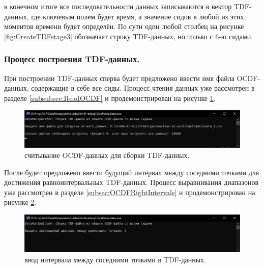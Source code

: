 {  \par в конечном итоге все последовательности данных записываются в вектор TDF-данных, где ключевым полем будет время, а значение сидов в любой из этих моментов времени будет определён. По сути один любой столбец на рисунке \ref{fig:CreateTDFstage3} обозначает строку TDF-данных, но только с 6-ю сидами. 

}

\subsubsection{ \standartTitleFont
  Процесс построения TDF-данных.
} \label{subsubsec:CreateTDFProc}

{\standartFont

  \par При построении TDF-данных сперва будет предложено ввести имя файла OCDF-данных, содержащие в себе все сиды. Процесс чтения данных уже рассмотрен в разделе \ref{subsubsec:ReadOCDF} и продемонстрирован на рисунке \ref{fig:CreateTDFReadData}. 

  \begin{figure}[H]
    \centering
    \includegraphics[width=\textwidth]{images/forDataManipulator/CreateTDFReadData.png}
    \caption{считывание OCDF-данных для сборки TDF-данных.} 
    \label{fig:CreateTDFReadData}
  \end{figure}

  \par После будет предложено ввести будущий интервал между соседними точками для достижения равноинтервальных TDF-данных. Процесс выравнивания диапазонов уже рассмотрен в разделе \ref{subsec:OCDFRightIntervals} и продемонстрирован на рисунке \ref{fig:CreateTDFRI}.

  \begin{figure}[H]
    \centering
    \includegraphics[width=\textwidth]{images/forDataManipulator/CreateTDFRI.png}
    \caption{ввод интервала между соседними точками в TDF-данных.} 
    \label{fig:CreateTDFRI}
  \end{figure}

}

